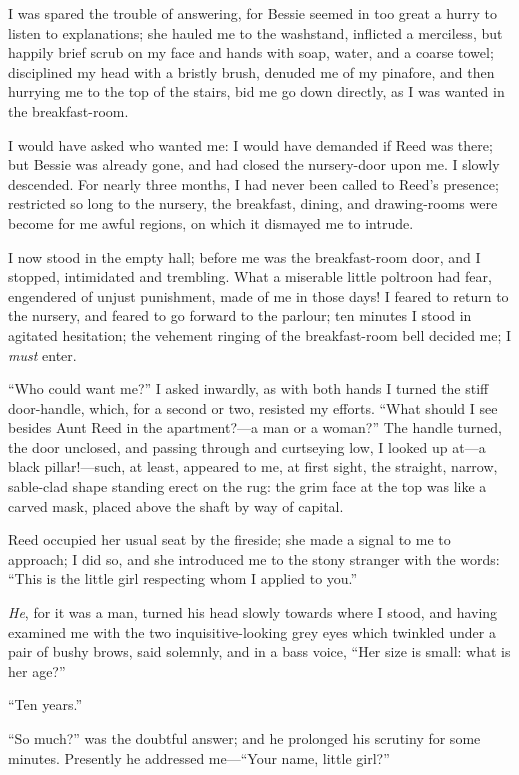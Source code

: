 I was spared the trouble of answering, for Bessie seemed in too great a
hurry to listen to explanations; she hauled me to the washstand,
inflicted a merciless, but happily brief scrub on my face and hands with
soap, water, and a coarse towel; disciplined my head with a bristly
brush, denuded me of my pinafore, and then hurrying me to the top of the
stairs, bid me go down directly, as I was wanted in the breakfast-room.

I would have asked who wanted me: I would have demanded if \Mrs{} Reed was
there; but Bessie was already gone, and had closed the nursery-door upon
me. I slowly descended. For nearly three months, I had never been
called to \Mrs{} Reed's presence; restricted so long to the nursery, the
breakfast, dining, and drawing-rooms were become for me awful regions,
on which it dismayed me to intrude.

I now stood in the empty hall; before me was the breakfast-room door,
and I stopped, intimidated and trembling. What a miserable little
poltroon had fear, engendered of unjust punishment, made of me in those
days! I feared to return to the nursery, and feared to go forward to
the parlour; ten minutes I stood in agitated hesitation; the vehement
ringing of the breakfast-room bell decided me; I \emph{must} enter.

\enquote{Who could want me?} I asked inwardly, as with both hands I
turned the stiff door-handle, which, for a second or two, resisted my
efforts. \enquote{What should I see besides Aunt Reed in the
apartment?---a man or a woman?} The handle turned, the door unclosed,
and passing through and curtseying low, I looked up at---a black
pillar!---such, at least, appeared to me, at first sight, the straight,
narrow, sable-clad shape standing erect on the rug: the grim face at the
top was like a carved mask, placed above the shaft by way of capital.

\Mrs{} Reed occupied her usual seat by the fireside; she made a signal to
me to approach; I did so, and she introduced me to the stony stranger
with the words: \enquote{This is the little girl respecting whom I
applied to you.}

\emph{He}, for it was a man, turned his head slowly towards where I
stood, and having examined me with the two inquisitive-looking grey eyes
which twinkled under a pair of bushy brows, said solemnly, and in a bass
voice, \enquote{Her size is small: what is her age?}

\enquote{Ten years.}

\enquote{So much?} was the doubtful answer; and he prolonged his
scrutiny for some minutes. Presently he addressed me---\enquote{Your
name, little girl?}

